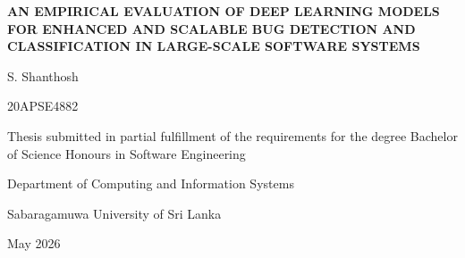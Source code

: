 \documentclass[12pt,a4paper,oneside]{report}
\begin{document}
\begin{titlepage}
\thispagestyle{empty}
\centering
\setlength{\parskip}{0pt}

{\fontsize{16}{28.8}\selectfont\bfseries
AN EMPIRICAL EVALUATION OF DEEP LEARNING MODELS FOR ENHANCED AND SCALABLE BUG DETECTION AND CLASSIFICATION IN LARGE-SCALE SOFTWARE SYSTEMS\par}

\vspace{36mm}

{\fontsize{14}{25.2}\selectfont S. Shanthosh\par}

\vspace{10mm}

{\fontsize{14}{25.2}\selectfont 20APSE4882\par}

\vspace{22mm}

{\fontsize{12}{18}\selectfont Thesis submitted in partial fulfillment of the requirements for the degree Bachelor of Science Honours in Software Engineering\par}

\vspace{22mm}

{\fontsize{14}{25.2}\selectfont Department of Computing and Information Systems\par}

\vspace{10mm}

{\fontsize{14}{25.2}\selectfont Sabaragamuwa University of Sri Lanka\par}

\vspace{16mm}

{\fontsize{14}{25.2}\selectfont May 2026\par}

\end{titlepage}

\setcounter{page}{1}
\end{document}
